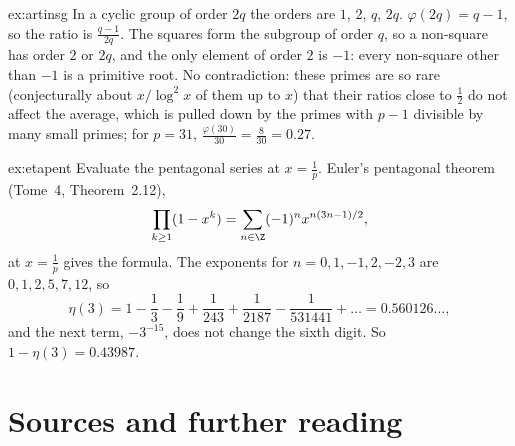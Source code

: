 \begin{solution}{ex:artinsg}
\idea In a cyclic group of order $2q$ the orders are $1$, $2$, $q$, $2q$.
\writeup $\varphi(2q)=q-1$, so the ratio is $\frac{q-1}{2q}$. The squares form the subgroup of order $q$, so a non-square has order $2$ or $2q$, and the only
element of order $2$ is $-1$: every non-square other than $-1$ is a primitive root. No contradiction: these primes are so rare (conjecturally about
$x/\log^2x$ of them up to $x$) that their ratios close to $\frac12$ do not affect the average, which is pulled down by the primes with $p-1$ divisible by many
small primes; for $p=31$, $\frac{\varphi(30)}{30}=\frac8{30}=0.27$.
\end{solution}

\begin{solution}{ex:etapent}
\idea Evaluate the pentagonal series at $x=\frac1p$.
\writeup Euler's pentagonal theorem (Tome~4, Theorem~2.12),
\[
\prod_{k\ge1}(1-x^k)=\sum_{n\in\Z}(-1)^nx^{n(3n-1)/2},
\]
at $x=\frac1p$ gives the formula. The exponents for
$n=0,1,-1,2,-2,3$ are $0,1,2,5,7,12$, so
\[
\eta(3)=1-\frac13-\frac19+\frac1{243}+\frac1{2187}-\frac1{531441}+\dots=0.560126\ldots,
\]
and the next term, $-3^{-15}$, does not change the sixth digit. So $1-\eta(3)=0.43987$.
\end{solution}

\section*{Sources and further reading}

